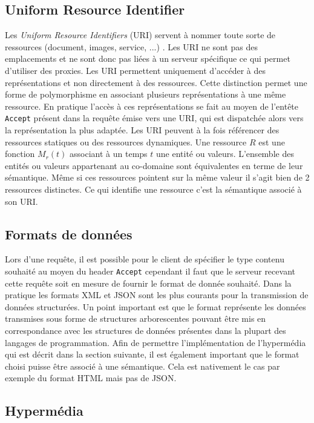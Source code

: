 \documentclass[a4paper, 11pt]{report}
\begin{document}
\subsection{Uniform Resource Identifier}

Les \emph{Uniform Resource Identifiers} (URI) servent à nommer toute
sorte de ressources (document, images, service, ...)
\cite{masinter2005uniform}. Les URI ne sont pas des emplacements et ne
sont donc pas liées à un serveur spécifique ce qui permet d'utiliser
des proxies. Les URI permettent uniquement d'accéder à des
représentations et non directement à des ressources. Cette distinction
permet une forme de polymorphisme en associant plusieurs
représentations à une même ressource. En pratique l'accès à ces
représentations se fait au moyen de l'entête \verb=Accept= présent
dans la requête émise vers une URI, qui est dispatchée alors vers la
représentation la plus adaptée. Les URI peuvent à la fois référencer
des ressources statiques ou des ressources dynamiques. Une ressource
$R$ est une fonction $M_r(t)$ associant à un temps $t$ une entité ou
valeurs. L'ensemble des entités ou valeurs appartenant au co-domaine
sont équivalentes en terme de leur sémantique. Même si ces ressources
pointent sur la même valeur il s'agit bien de 2 ressources distinctes.
Ce qui identifie une ressource c'est la sémantique associé à son URI.

\subsection{Formats de données}

Lors d'une requête, il est possible pour le client de spécifier le
type contenu souhaité au moyen du header \verb=Accept= cependant il
faut que le serveur recevant cette requête soit en mesure de fournir
le format de donnée souhaité. Dans la pratique les formats XML et JSON
sont les plus courants pour la transmission de données structurées. Un
point important est que le format représente les données transmises
sous forme de structures arborescentes pouvant être mis en
correspondance avec les structures de données présentes dans la
plupart des langages de programmation. Afin de permettre
l'implémentation de l'hypermédia qui est décrit dans la section
suivante, il est également important que le format choisi puisse être
associé à une sémantique. Cela est nativement le cas par exemple du
format HTML mais pas de JSON.

\subsection{Hypermédia}
\end{document}

